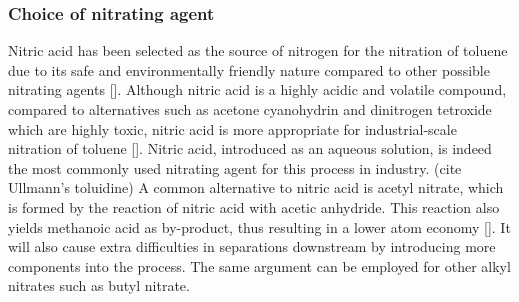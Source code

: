 \subsubsection{Choice of nitrating agent}
Nitric acid has been selected as the source of nitrogen for the nitration of toluene due to its safe and environmentally friendly nature compared to other possible nitrating agents []. Although nitric acid is a highly acidic and volatile compound, compared to alternatives such as acetone cyanohydrin and dinitrogen tetroxide which are highly toxic, nitric acid is more appropriate for industrial-scale nitration of toluene []. Nitric acid, introduced as an aqueous solution, is indeed the most commonly used nitrating agent for this process in industry. (cite Ullmann's toluidine) A common alternative to nitric acid is acetyl nitrate, which is formed by the reaction of nitric acid with acetic anhydride. This reaction also yields methanoic acid as by-product, thus resulting in a lower atom economy []. It will also cause extra difficulties in separations downstream by introducing more components into the process. The same argument can be employed for other alkyl nitrates such as butyl nitrate. 



